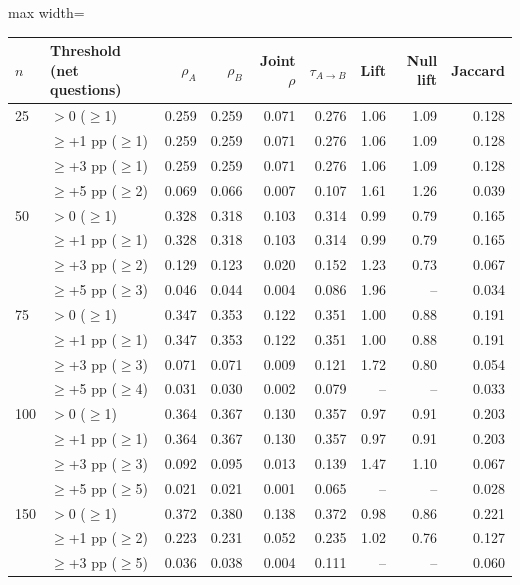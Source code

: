 \begin{table}[t]
\centering
\small
\begin{adjustbox}{max width=\linewidth}
\begin{tabular}{llrrrrrrr}
\toprule
$n$ & Threshold (net questions) & $\rho_A$ & $\rho_B$ & Joint $\rho$ & $\tau_{A\to B}$ & Lift & Null lift & Jaccard \\
\midrule
25 & $>0$ ($\ge$1) & 0.259 & 0.259 & 0.071 & 0.276 & 1.06 & 1.09 & 0.128 \\
 & $\ge$+1 pp ($\ge$1) & 0.259 & 0.259 & 0.071 & 0.276 & 1.06 & 1.09 & 0.128 \\
 & $\ge$+3 pp ($\ge$1) & 0.259 & 0.259 & 0.071 & 0.276 & 1.06 & 1.09 & 0.128 \\
 & $\ge$+5 pp ($\ge$2) & 0.069 & 0.066 & 0.007 & 0.107 & 1.61 & 1.26 & 0.039 \\
\midrule
50 & $>0$ ($\ge$1) & 0.328 & 0.318 & 0.103 & 0.314 & 0.99 & 0.79 & 0.165 \\
 & $\ge$+1 pp ($\ge$1) & 0.328 & 0.318 & 0.103 & 0.314 & 0.99 & 0.79 & 0.165 \\
 & $\ge$+3 pp ($\ge$2) & 0.129 & 0.123 & 0.020 & 0.152 & 1.23 & 0.73 & 0.067 \\
 & $\ge$+5 pp ($\ge$3) & 0.046 & 0.044 & 0.004 & 0.086 & 1.96 & -- & 0.034 \\
\midrule
75 & $>0$ ($\ge$1) & 0.347 & 0.353 & 0.122 & 0.351 & 1.00 & 0.88 & 0.191 \\
 & $\ge$+1 pp ($\ge$1) & 0.347 & 0.353 & 0.122 & 0.351 & 1.00 & 0.88 & 0.191 \\
 & $\ge$+3 pp ($\ge$3) & 0.071 & 0.071 & 0.009 & 0.121 & 1.72 & 0.80 & 0.054 \\
 & $\ge$+5 pp ($\ge$4) & 0.031 & 0.030 & 0.002 & 0.079 & -- & -- & 0.033 \\
\midrule
100 & $>0$ ($\ge$1) & 0.364 & 0.367 & 0.130 & 0.357 & 0.97 & 0.91 & 0.203 \\
 & $\ge$+1 pp ($\ge$1) & 0.364 & 0.367 & 0.130 & 0.357 & 0.97 & 0.91 & 0.203 \\
 & $\ge$+3 pp ($\ge$3) & 0.092 & 0.095 & 0.013 & 0.139 & 1.47 & 1.10 & 0.067 \\
 & $\ge$+5 pp ($\ge$5) & 0.021 & 0.021 & 0.001 & 0.065 & -- & -- & 0.028 \\
\midrule
150 & $>0$ ($\ge$1) & 0.372 & 0.380 & 0.138 & 0.372 & 0.98 & 0.86 & 0.221 \\
 & $\ge$+1 pp ($\ge$2) & 0.223 & 0.231 & 0.052 & 0.235 & 1.02 & 0.76 & 0.127 \\
 & $\ge$+3 pp ($\ge$5) & 0.036 & 0.038 & 0.004 & 0.111 & -- & -- & 0.060 \\

\end{tabular}
\end{adjustbox}
\end{table}
